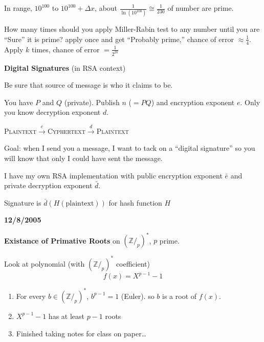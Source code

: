 In range, $10^{100}$ to $10^{100} + \Delta x$, about $\frac{1}{\ln(10^{100})} \cong \frac{1}{230}$ of number are prime.

How many times should you apply Miller-Rabin test to any number until you are ``Sure'' it is prime? apply once and get ``Probably prime,'' chance of error $\approx \frac{1}{4}$. Apply $k$ times, chance of error $= \frac{1}{2^{2k}}$

\textbf{Digital Signatures} (in RSA context)

Be sure that source of message is who it claims to be.

You have $P$ and $Q$ (private). Publish $n$ ($=PQ$) and encryption exponent $e$. Only you know decryption exponent $d$.

\textsc{Plaintext}$\stackrel{e}{\rightarrow}$\textsc{Cyphertext}$\stackrel{d}{\rightarrow}$\textsc{Plaintext}

Goal: when I send you a message, I want to tack on a ``digital signature'' so you will know that only I could have sent the message.

I have my own RSA implementation with public encryption exponent $\bar{e}$ and private decryption exponent $\bar{d}$.

Signature is $\bar{d}(H(\mbox{plaintext}))$ for hash function $H$

\textbf{12/8/2005}

\textbf{Existance of Primative Roots} on $(\mathbb{Z}/_p)^*$, $p$ prime.

Look at polynomial (with $(\mathbb{Z}/_p)^*$ coefficient)
\[
f(x) = X^{p-1} - 1
\]
\begin{enumerate}
	\item For every $b \in (\mathbb{Z}/_p)^*$, $b^{p-1} = 1$ (Euler). so $b$ is a root of $f(x)$.
	\item $X^{p-1} - 1$ has at least $p-1$ roots
	\item Finished taking notes for class on paper\dots
\end{enumerate}




